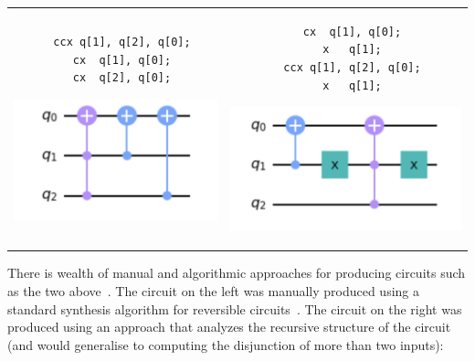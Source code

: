 \medskip
\begin{tabular}{c@{\qquad}c}
\begin{minipage}[t]{0.42\linewidth}
  \begin{verbatim}
  ccx q[1], q[2], q[0];
  cx  q[1], q[0];
  cx  q[2], q[0];
  \end{verbatim}
  \includegraphics[scale=0.7]{reversibleOr.png}
  \end{minipage}
&
\begin{minipage}[t]{0.43\linewidth}
  \begin{verbatim}
  cx  q[1], q[0];
  x   q[1];
  ccx q[1], q[2], q[0];
  x   q[1];
  \end{verbatim}
  \includegraphics[scale=0.6]{reversibleOr2.png}
  \end{minipage}
\end{tabular}

\medskip

There is wealth of manual and algorithmic approaches for producing circuits such
as the two above~\cite{maslov:2003:rls:1087512,1201583}. The circuit on the left
was manually produced using a standard synthesis algorithm for reversible
circuits~\cite{10.1145/775832.775915}. The circuit on the right was produced
using an approach that analyzes the recursive structure of the circuit (and
would generalise to computing the disjunction of more than two inputs):


